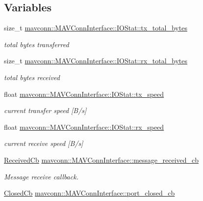 \subsection*{Variables}
\begin{DoxyCompactItemize}
\item 
size\+\_\+t \mbox{\hyperlink{group__mavconn_ga941de0f0d1968c6b2d272d5834d8f526}{mavconn\+::\+M\+A\+V\+Conn\+Interface\+::\+I\+O\+Stat\+::tx\+\_\+total\+\_\+bytes}}
\begin{DoxyCompactList}\small\item\em total bytes transferred \end{DoxyCompactList}\item 
size\+\_\+t \mbox{\hyperlink{group__mavconn_ga3f5e58792c58b0400dcd903c821e97cb}{mavconn\+::\+M\+A\+V\+Conn\+Interface\+::\+I\+O\+Stat\+::rx\+\_\+total\+\_\+bytes}}
\begin{DoxyCompactList}\small\item\em total bytes received \end{DoxyCompactList}\item 
float \mbox{\hyperlink{group__mavconn_gadbe490b44c012f629ee0dc0302c17a8b}{mavconn\+::\+M\+A\+V\+Conn\+Interface\+::\+I\+O\+Stat\+::tx\+\_\+speed}}
\begin{DoxyCompactList}\small\item\em current transfer speed \mbox{[}B/s\mbox{]} \end{DoxyCompactList}\item 
float \mbox{\hyperlink{group__mavconn_gaf125917de0e57f9f394f038c71799fa0}{mavconn\+::\+M\+A\+V\+Conn\+Interface\+::\+I\+O\+Stat\+::rx\+\_\+speed}}
\begin{DoxyCompactList}\small\item\em current receive speed \mbox{[}B/s\mbox{]} \end{DoxyCompactList}\item 
\mbox{\hyperlink{group__mavconn_ga1d04ead963f1685f3aaf4b18ffb49ff7}{Received\+Cb}} \mbox{\hyperlink{group__mavconn_ga47d4ac1fa3ceb8797164b56c517f1ff8}{mavconn\+::\+M\+A\+V\+Conn\+Interface\+::message\+\_\+received\+\_\+cb}}
\begin{DoxyCompactList}\small\item\em Message receive callback. \end{DoxyCompactList}\item 
\mbox{\hyperlink{group__mavconn_ga6eef19e745c84f9b0b85d704b2e3e430}{Closed\+Cb}} \mbox{\hyperlink{group__mavconn_gaf00411ca9b9fbe3329804f22755dee05}{mavconn\+::\+M\+A\+V\+Conn\+Interface\+::port\+\_\+closed\+\_\+cb}}

\end{DoxyCompactItemize}
